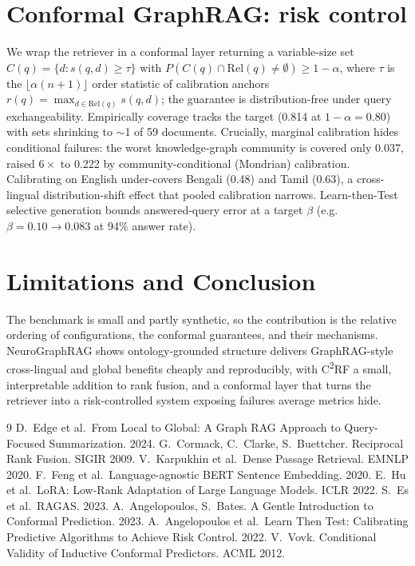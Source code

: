 \documentclass[10pt,twocolumn]{article}
\begin{document}
\section{Conformal GraphRAG: risk control}
We wrap the retriever in a conformal layer returning a variable-size set
$C(q)=\{d: s(q,d)\ge\tau\}$ with $P(C(q)\cap\mathrm{Rel}(q)\neq\emptyset)\ge 1-\alpha$, where $\tau$ is
the $\lfloor\alpha(n+1)\rfloor$ order statistic of calibration anchors $r(q)=\max_{d\in\mathrm{Rel}(q)}
s(q,d)$; the guarantee is distribution-free under query exchangeability. Empirically coverage tracks the
target (0.814 at $1-\alpha=0.80$) with sets shrinking to $\sim$1 of 59 documents. Crucially, marginal
calibration hides conditional failures: the worst knowledge-graph community is covered only 0.037,
raised $6\times$ to 0.222 by community-conditional (Mondrian) calibration. Calibrating on English
under-covers Bengali (0.48) and Tamil (0.63), a cross-lingual distribution-shift effect that pooled
calibration narrows. Learn-then-Test selective generation bounds answered-query error at a target
$\beta$ (e.g.\ $\beta{=}0.10\to0.083$ at 94\% answer rate).

\section{Limitations and Conclusion}
The benchmark is small and partly synthetic, so the contribution is the relative ordering of
configurations, the conformal guarantees, and their mechanisms. NeuroGraphRAG shows ontology-grounded
structure delivers GraphRAG-style cross-lingual and global benefits cheaply and reproducibly, with
C\textsuperscript{2}RF a small, interpretable addition to rank fusion, and a conformal layer that turns
the retriever into a risk-controlled system exposing failures average metrics hide.

\begin{thebibliography}{9}
 D.\ Edge et al.\ From Local to Global: A Graph RAG Approach to Query-Focused Summarization. 2024.
 G.\ Cormack, C.\ Clarke, S.\ Buettcher. Reciprocal Rank Fusion. SIGIR 2009.
 V.\ Karpukhin et al.\ Dense Passage Retrieval. EMNLP 2020.
 F.\ Feng et al.\ Language-agnostic BERT Sentence Embedding. 2020.
 E.\ Hu et al.\ LoRA: Low-Rank Adaptation of Large Language Models. ICLR 2022.
 S.\ Es et al.\ RAGAS. 2023.
 A.\ Angelopoulos, S.\ Bates. A Gentle Introduction to Conformal Prediction. 2023.
 A.\ Angelopoulos et al.\ Learn Then Test: Calibrating Predictive Algorithms to Achieve Risk Control. 2022.
 V.\ Vovk. Conditional Validity of Inductive Conformal Predictors. ACML 2012.
\end{thebibliography}
\end{document}
